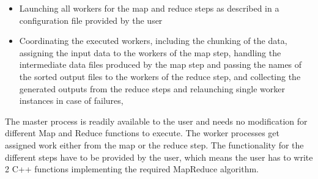 \documentclass[conference,final]{IEEEtran}
\newcommand{\jhanote}[1]{ {\textcolor{red} { ***SJ: #1 }}}
\newcommand{\jhanote}[1]{}
\begin{document}

\begin{itemize}
\item Launching all workers for the map and reduce steps as described
  in a configuration file provided by the user 
\item Coordinating the executed workers, including the chunking of the
  data, assigning the input data to the workers of the map step,
  handling the intermediate data files produced by the map step and
  passing the names of the sorted output files to the workers of the
  reduce step, and collecting the generated outputs from the reduce
  steps and relaunching single worker instances in case of failures,
\end{itemize}

The master process is readily available to the user and needs no
modification for different Map and Reduce functions to execute.  The
worker processes get assigned work either from the map or the reduce
step. The functionality for the different steps have to be provided by
the user, which means the user has to write 2 C++ functions
implementing the required MapReduce algorithm.
\end{document}
